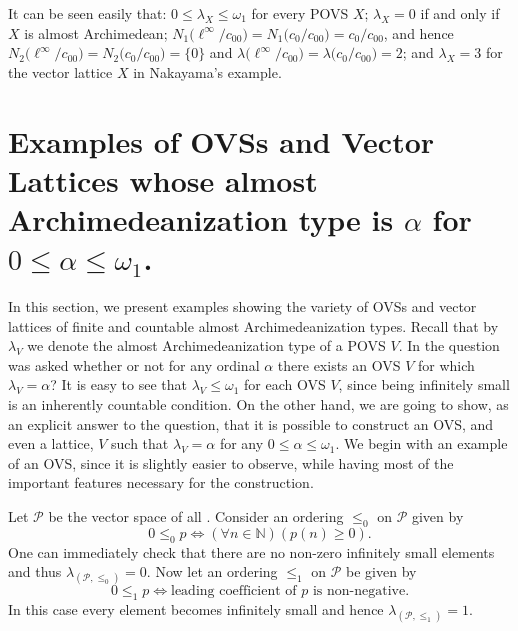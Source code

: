 \documentclass[10pt]{article}
\renewcommand{\a}{\alpha}
\newcommand{\w}{\omega}
\begin{document}
\medskip
It can be seen easily that: $0\leqslant\lambda_X\leqslant{\w}_1$ for every POVS $X$; $\lambda_X=0$ if and only if $X$ is almost Archimedean;
$N_1\bigl(\ell^\infty/c_{00}\bigl)=N_1\bigl(c_0/c_{00}\bigl)=c_0/c_{00}$, and hence $N_2\bigl(\ell^\infty/c_{00}\bigl)=N_2\bigl(c_0/c_{00}\bigl)=\{0\}$
and $\lambda\bigl(\ell^\infty/c_{00}\bigl)=\lambda\bigl(c_0/c_{00}\bigl)=2$; and $\lambda_X=3$ for the vector lattice $X$ in Nakayama's example.


\section{Examples of OVSs and Vector Lattices whose almost Archimedeanization type is $\a$ for $0\leqslant\a\leqslant\w_1$.}

\hspace{4mm}
In this section, we present examples showing the variety of OVSs and vector lattices of finite and countable almost Archimedeanization types.
Recall that by $\lambda_V$ we denote the almost Archimedeanization type of a POVS $V$. 
In \cite{E-2017} the question was asked whether or not for any ordinal $\a$ there exists an OVS $V$ for which $\lambda_V=\a$?
It is easy to see that $\lambda_V\leqslant\w_1$ for each OVS $V$, since being infinitely small is an inherently countable condition.
On the other hand, we are going to show, as an explicit answer to the question, that it is possible to construct an OVS, and even a lattice, 
$ V $ such that $\lambda_V=\a$ for any $0\leqslant\a\leqslant\w_1$. We begin with an example of an OVS, since it is slightly easier to observe, 
while having most of the important features necessary for the construction.

\medskip
Let $\mathcal{P}$ be the vector space of all {\color{blue}{real polynomials}}. Consider an ordering $\leqslant_0$ on $\mathcal{P}$ given by
$$
   0 \leqslant_0 p \iff ( \forall n \in \mathbb{N} )( p(n) \geqslant 0 ).
$$
One can immediately check that there are no non-zero infinitely small elements and thus $\lambda_{(\mathcal{P}, \leqslant_0)}=0$.
Now let an ordering $\leqslant_1$ on $\mathcal{P}$ be given by
$$
   0 \leqslant_1 p \iff \text{leading coefficient of } p \text{ is non-negative}.
$$
In this case every element becomes infinitely small and hence $\lambda_{(\mathcal{P}, \leqslant_1)}=1$.
\end{document}
